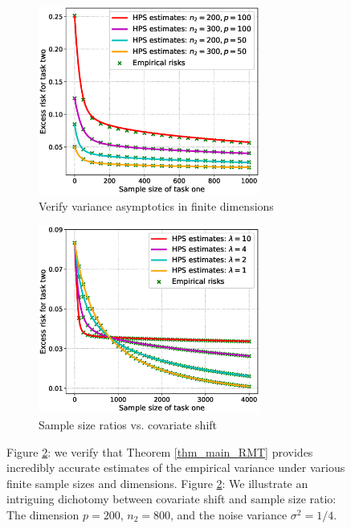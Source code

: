 \begin{figure}[!t]
	\begin{subfigure}[b]{0.5\textwidth}
		\centering
		\includegraphics[width=0.8\textwidth]{figures/verify_covariate_shift.eps}
		\caption{Verify variance asymptotics in finite dimensions}
		\label{fig_sec3_verify_cov}
	\end{subfigure}
	\begin{subfigure}[b]{0.5\textwidth}
		\centering
		\includegraphics[width=0.8\textwidth]{figures/covariate_shift.eps}
		\caption{Sample size ratios vs. covariate shift}
		\label{fig_sec3_covariate}
	\end{subfigure}
	\caption{Figure \ref{fig_sec3_covariate}: we verify that Theorem \ref{thm_main_RMT} provides incredibly accurate estimates of the empirical variance under various finite sample sizes and dimensions.
	Figure \ref{fig_sec3_covariate}: We illustrate an intriguing dichotomy between covariate shift and sample size ratio: The dimension $p = 200$, $n_2 = 800$, and the noise variance $\sigma^2 = 1/4$.}
	\label{fig_sec31}
\end{figure}

